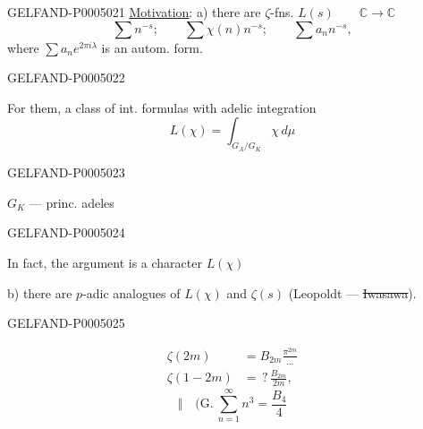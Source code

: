 \begin{GelfandAdjacentEvidence}{GELFAND-P000502}{1}
\uline{Motivation}: a) there are $\zeta$-fns.
$L(s)\qquad \mathbb C\longrightarrow\mathbb C$
\[
\sum n^{-s};\qquad \sum\chi(n)n^{-s};\qquad \sum a_n n^{-s},
\]
where $\sum a_n e^{2\pi i\lambda}$ is an autom. form.
\end{GelfandAdjacentEvidence}
\begin{GelfandAdjacentEvidence}{GELFAND-P000502}{2}


For them, a class of int. formulas with adelic integration
\[
L(\chi)=\int_{G_A/G_K}\chi\,d\mu
\]
\end{GelfandAdjacentEvidence}
\begin{GelfandAdjacentEvidence}{GELFAND-P000502}{3}

\begin{flushright}
$G_K$ — princ. adeles
\end{flushright}
\end{GelfandAdjacentEvidence}
\begin{GelfandAdjacentEvidence}{GELFAND-P000502}{4}


In fact, the argument is a character $L(\chi)$

b) there are $p$-adic analogues of $L(\chi)$ and $\zeta(s)$
(Leopoldt — \sout{Iwasawa}).
\end{GelfandAdjacentEvidence}
\begin{GelfandAdjacentEvidence}{GELFAND-P000502}{5}

\begin{align*}
\zeta(2m)&=B_{2m}\frac{\pi^{2m}}{\ldots}\\
\zeta(1-2m)&=\,?\,\frac{B_{2m}}{2m},
\end{align*}
\[
\Vert\quad \biggl(\text{G.}\ \sum_{n=1}^{\infty}n^3=\frac{B_4}{4}
\]
\end{GelfandAdjacentEvidence}
